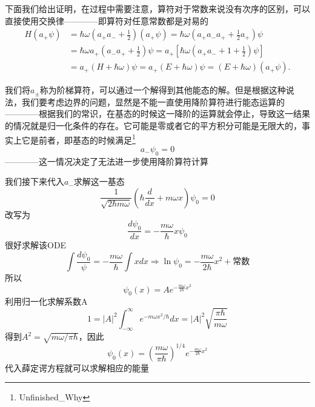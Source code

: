 		下面我们给出证明，在过程中需要注意，算符对于常数来说没有次序的区别，可以直接使用交换律————即算符对任意常数都是对易的
		\begin{equation}
			\begin{aligned}
			H\left(a_{+} \psi\right) &=\hbar \omega\left(a_{+} a_{-}+\frac{1}{2}\right)\left(a_{+} \psi\right)=\hbar \omega\left(a_{+} a_{-} a_{+}+\frac{1}{2} a_{+}\right) \psi \\
			&=\hbar \omega a_{+}\left(a_{-} a_{+}+\frac{1}{2}\right) \psi=a_{+}\left[\hbar \omega\left(a_{+} a_{-}+1+\frac{1}{2}\right) \psi\right] \\
			&=a_{+}(H+\hbar \omega) \psi=a_{+}(E+\hbar \omega) \psi=(E+\hbar \omega)\left(a_{+} \psi\right) .
			\end{aligned}
		\end{equation}

		我们将$a_{\pm}$称为阶梯算符，可以通过一个解得到其他能态的解。但是根据这种说法，我们要考虑边界的问题，显然是不能一直使用降阶算符进行能态运算的————根据我们的常识，在基态的时候这一降阶的运算就会停止，导致这一结果的情况就是归一化条件的存在。它可能是零或者它的平方积分可能是无限大的，事实上它是前者，即基态的时候满足\footnote{Unfinished\_Why}
		\begin{equation}
			a_{-} \psi_{0}=0
		\end{equation}
		————这一情况决定了无法进一步使用降阶算符计算

		我们接下来代入$a_-$求解这一基态
		\begin{equation}
			\frac{1}{\sqrt{2 \hbar m \omega}}\left(\hbar \frac{d}{d x}+m \omega x\right) \psi_{0}=0
		\end{equation}
		改写为
		\begin{equation}
			\frac{d \psi_{0}}{d x}=-\frac{m \omega}{\hbar} x \psi_{0}
		\end{equation}
		很好求解该ODE
		\begin{equation}
			\int \frac{d \psi_{0}}{\psi}=-\frac{m \omega}{\hbar} \int x d x \Rightarrow \ln \psi_{0}=-\frac{m \omega}{2 \hbar} x^{2}+\text{常数}
		\end{equation}
		所以
		\begin{equation}
			\psi_{0}(x)=A e^{-\frac{m \omega}{2 \hbar} x^{2}}
		\end{equation}
		利用归一化求解系数A
		\begin{equation}
			1=|A|^{2} \int_{-\infty}^{\infty} e^{-m \omega x^{2} / \hbar} d x=|A|^{2} \sqrt{\frac{\pi \hbar}{m \omega}}
		\end{equation}
		得到$A^{2}=\sqrt{m \omega / \pi \hbar}$，因此
		\begin{equation}
			\boxed{\psi_{0}(x)=\left(\frac{m \omega}{\pi \hbar}\right)^{1 / 4} e^{-\frac{m \omega}{2 \hbar} x^{2}}}
		\end{equation}
		代入薛定谔方程就可以求解相应的能量

